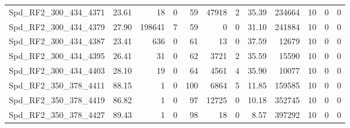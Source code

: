 \begin{longtable}[c]{@{}lrrrrrrrrrrr@{}}
Spd\_RF2\_300\_434\_4371      & 23.61                  & 18                      & 0                       & 59                     & 47918                   & 2                       & 35.39                   & 234664                   & 10                       & 0                        & 0                        \\
Spd\_RF2\_300\_434\_4379      & 27.90                  & 198641                  & 7                       & 59                     & 0                       & 0                       & 31.10                   & 241884                   & 10                       & 0                        & 0                        \\
Spd\_RF2\_300\_434\_4387      & 23.41                  & 636                     & 0                       & 61                     & 13                      & 0                       & 37.59                   & 12679                    & 10                       & 0                        & 0                        \\
Spd\_RF2\_300\_434\_4395      & 26.41                  & 31                      & 0                       & 62                     & 3721                    & 2                       & 35.59                   & 15590                    & 10                       & 0                        & 0                        \\
Spd\_RF2\_300\_434\_4403      & 28.10                  & 19                      & 0                       & 64                     & 4561                    & 4                       & 35.90                   & 10077                    & 10                       & 0                        & 0                        \\
Spd\_RF2\_350\_378\_4411      & 88.15                  & 1                       & 0                       & 100                    & 6864                    & 5                       & 11.85                   & 159585                   & 10                       & 0                        & 0                        \\
Spd\_RF2\_350\_378\_4419      & 86.82                  & 1                       & 0                       & 97                     & 12725                   & 0                       & 10.18                   & 352745                   & 10                       & 0                        & 0                        \\
Spd\_RF2\_350\_378\_4427      & 89.43                  & 1                       & 0                       & 98                     & 18                      & 0                       & 8.57                    & 397292                   & 10                       & 0                        & 0                        \\

\end{longtable}
